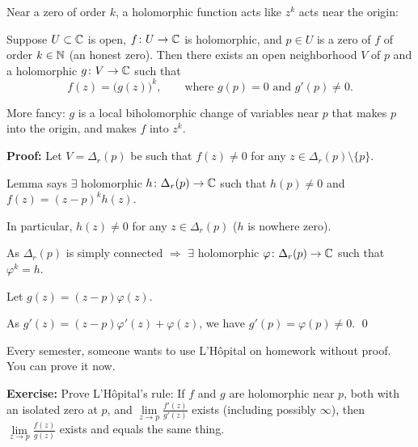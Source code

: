 \documentclass[10pt,aspectratio=169]{beamer}
\begin{document}
\begin{frame}

Near a zero of order $k$, a holomorphic function acts like
$z^k$ acts near the origin:

\pause

\begin{theorem}
Suppose $U \subset {\mathbb{C}}$ is open, $f \colon U \to {\mathbb{C}}$ is holomorphic,
and $p \in U$ is a zero of $f$ of order $k \in {\mathbb{N}}$ (an honest zero).
\pause
Then there exists an open neighborhood $V$
of $p$ and a holomorphic $g \colon V \to {\mathbb{C}}$ such that
\[
f(z) = {\bigl( g(z) \bigr)}^k,
\qquad
\text{where $g(p) = 0$ and $g'(p) \not= 0$.}
\]
\end{theorem}

\medskip
\pause

More fancy: $g$ is a local biholomorphic change of variables near
$p$
that makes $p$ into the origin, and makes $f$ into $z^k$.

\medskip
\pause

\textbf{Proof:}
Let $V = \Delta_r(p)$ be such that $f(z) \not= 0$ for any $z \in
\Delta_r(p) \setminus \{ p \}$.

\medskip
\pause

Lemma says $\exists$ holomorphic
$h \colon \Delta_r(p) \to {\mathbb{C}}$ such that
$h(p) \not= 0$ and $f(z) = {(z-p)}^k h(z)$.

\medskip
\pause

In particular,
$h(z) \not= 0$ for any $z \in \Delta_r(p)$ ($h$ is nowhere zero).

\medskip
\pause

As
$\Delta_r(p)$ is simply connected
$\Rightarrow$
$\exists$ holomorphic $\varphi \colon \Delta_r(p) \to {\mathbb{C}}$ such that
$\varphi^k = h$.

\medskip
\pause

Let $g(z) = (z-p)\varphi(z)$.

\medskip
\pause

As
$g'(z) = (z-p) \varphi'(z) + \varphi(z)$, we have $g'(p) = \varphi(p) \not= 0$.
\qed
\end{frame}

\begin{frame}

Every semester, someone wants to use L'H\^{o}pital on homework without
proof.  You can prove it now.

\medskip
\pause

\textbf{Exercise:}
Prove L'H\^{o}pital's rule: If $f$ and $g$ are holomorphic near $p$,
both with an isolated zero at $p$, and
$\lim\limits_{z\to p} \frac{f'(z)}{g'(z)}$ exists (including possibly $\infty$), then
$\lim\limits_{z\to p} \frac{f(z)}{g(z)}$ exists and equals the same thing.
\end{frame}
\end{document}
